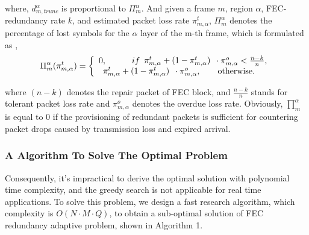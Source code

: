 where, $d_{m,trunc}^\alpha$ is proportional to $\Pi _m^\alpha$. And given a frame $m$, region $\alpha$, FEC-redundancy rate $k$, and estimated packet loss rate $\pi _{m,\alpha }^t$,
$\Pi _m^\alpha$ denotes the percentage of lost symbols for the $\alpha$ layer of the m-th frame, which is
formulated as ,
\[\Pi _m^\alpha (\pi _{m,\alpha }^t)  = \left\{ \begin{array}{l}
0,\begin{array}{*{20}{c}}
{\begin{array}{*{20}{c}}
	{}&{}
	\end{array}}
\end{array}if\begin{array}{*{20}{c}}
{\pi _{m,\alpha }^t + (1 - \pi _{m,\alpha }^t)}
\end{array} \cdot \pi _{m,\alpha }^o < \frac{{n - k}}{n},\\
\begin{array}{*{20}{c}}
{\pi _{m,\alpha }^t + (1 - \pi _{m,\alpha }^t)}
\end{array} \cdot \pi _{m,\alpha }^o,\begin{array}{*{20}{c}}
{}&{}
\end{array}{\rm{otherwise}}{\rm{.}}
\end{array} \right.\]

where $(n-k)$ denotes the repair packet of FEC block, and  $\frac{{n - k}}{n}$
stands for tolerant packet loss rate and $\pi _{m,\alpha }^o$ denotes the overdue loss rate. Obviously, $\prod _m^\alpha$ is equal to 0 if the provisioning of redundant packets is sufficient for countering packet drops caused by transmission loss and expired arrival. 



\subsubsection{A Algorithm To Solve The Optimal Problem}

Consequently, it's impractical to derive the optimal solution with polynomial time complexity, and the greedy search is not applicable for real time applications. To solve this problem, we design a fast research algorithm, which complexity is $O(N \cdot M \cdot Q)$, to obtain a sub-optimal solution of FEC redundancy adaptive problem, shown in Algorithm 1. 


